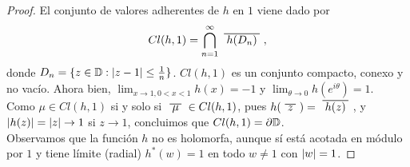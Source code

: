 \begin{proof}
    El conjunto de valores adherentes de $h$ en $1$ viene dado por
    \begin{equation*}
        Cl(h,1) = \bigcap_{n=1}^{\infty} \xbar{h(D_n)},
    \end{equation*}
    donde $D_n = \{z \in \mathbb{D} : \left\lvert z-1\right\rvert \leq \frac{1}{n}\}$. $Cl(h,1)$ es un conjunto compacto, conexo y no vacío. Ahora bien, $\lim_{x \to 1, 0 < x < 1} h(x) = -1$ y $\lim_{\theta \to 0} h(e^{i \theta}) = 1$. \\

    Como $\mu \in Cl(h,1)$ si y solo si $\xbar{\mu} \in Cl(h,1)$, pues $h(\xbar{z}) = \xbar{h(z)}$, y $\left\lvert h(z)\right\rvert = \left\lvert z\right\rvert \to 1$ si $z \to 1$, concluimos que $Cl(h,1) = \partial \mathbb{D}$. \\

    Observamos que la función $h$ no es holomorfa, aunque sí está acotada en módulo por $1$ y tiene límite (radial) $h^*(w) = 1$ en todo $w\neq 1$ con $\left\lvert w\right\rvert = 1$.
\end{proof}


